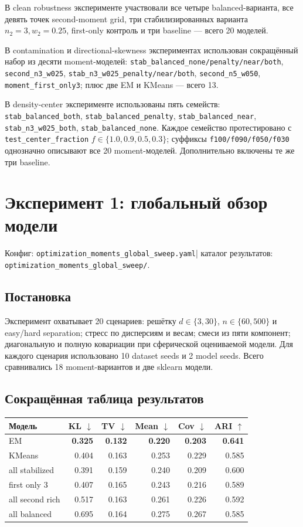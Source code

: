 \documentclass[11pt,a4paper]{article}
\newcommand{\code}[1]{{\footnotesize\nolinkurl{#1}}}
\newcommand{\best}[1]{\textbf{\color{green}#1}}
\newcommand{\configlink}[1]{%
  \code{#1.yaml}}
\newcommand{\resultslink}[1]{%
  \code{#1/}}
\newcommand{\runrefs}[1]{%
  \small\color{midgray}%
  Конфиг: \configlink{#1}\enspace|\enspace
  каталог результатов: \resultslink{#1}.%
  \normalsize\color{black}}
\begin{document}
В clean robustness эксперименте участвовали все четыре balanced-варианта,
все девять точек second-moment grid, три стабилизированных варианта
$n_2=3,w_2=0.25$, first-only контроль и три baseline --- всего 20 моделей.

В contamination и directional-skewness экспериментах использован сокращённый
набор из десяти moment-моделей:
\code{stab_balanced_none/penalty/near/both},
\code{second_n3_w025},
\code{stab_n3_w025_penalty/near/both},
\code{second_n5_w050},
\code{moment_first_only3};
плюс две EM и KMeans --- всего 13.

В density-center эксперименте использованы пять семейств:
\code{stab_balanced_both}, \code{stab_balanced_penalty},
\code{stab_balanced_near}, \code{stab_n3_w025_both},
\code{stab_balanced_none}. Каждое семейство протестировано с
\code{test_center_fraction} $f\in\{1.0,0.9,0.5,0.3\}$; суффиксы
\code{f100/f090/f050/f030} однозначно описывают все 20 moment-моделей.
Дополнительно включены те же три baseline.

\section{Эксперимент 1: глобальный обзор модели}

\runrefs{optimization_moments_global_sweep}

\subsection{Постановка}

Эксперимент охватывает 20 сценариев: решётку
$d\in\{3,30\}$, $n\in\{60,500\}$ и easy/hard separation;
стресс по дисперсиям и весам; смеси из пяти компонент; диагональную и полную
ковариации при сферической оцениваемой модели. Для каждого сценария использовано 10 dataset
seeds и 2 model seeds. Всего сравнивались 18 moment-вариантов и две sklearn
модели.

\subsection{Сокращённая таблица результатов}

\begin{center}
\small
\begin{tabular}{@{}lrrrrr@{}}
\toprule
\rowcolor{lightgray}
\textbf{Модель} & \textbf{KL} $\downarrow$ & \textbf{TV} $\downarrow$ &
\textbf{Mean} $\downarrow$ & \textbf{Cov} $\downarrow$ & \textbf{ARI} $\uparrow$\\
\midrule
EM & \best{0.325} & \best{0.132} & \best{0.220} & \best{0.203} & \best{0.641}\\
KMeans & 0.404 & 0.163 & 0.253 & 0.229 & 0.585\\
all stabilized & 0.391 & 0.159 & 0.240 & 0.209 & 0.600\\
first only 3 & 0.407 & 0.165 & 0.243 & 0.216 & 0.589\\
all second rich & 0.517 & 0.163 & 0.261 & 0.226 & 0.592\\
all balanced & 0.695 & 0.164 & 0.275 & 0.267 & 0.585\\
\bottomrule
\end{tabular}
\end{center}
\end{document}
